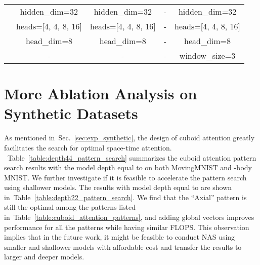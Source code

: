 \documentclass{article}
\newcommand{\tabref}[1]{Table~\ref{#1}}
\newcommand{\secref}[1]{Sec.~\ref{#1}}
\def\nbody{-body MNIST}
\begin{document}
\begin{table}[!tb]
\begin{center}
{\begin{tabular}{l|c|c|c|c}
   & hidden\_dim=32 & hidden\_dim=32    & -    & hidden\_dim=32 \\
   & heads=[4, 4, 8, 16] & heads=[4, 4, 8, 16] & - & heads=[4, 4, 8, 16] \\
   & head\_dim=8 & head\_dim=8 & - & head\_dim=8 \\
   & - & - & - & window\_size=3 \\
	\bottomrule[1.5pt]
	\end{tabular}
	}  \end{center}
\end{table}





\section{More Ablation Analysis on Synthetic Datasets}
As mentioned in~\secref{sec:exp_synthetic}, the design of cuboid attention greatly facilitates the search for optimal space-time attention. 
~\tabref{table:depth44_pattern_search} summarizes the cuboid attention pattern search results with the model depth equal to  on both MovingMNIST and \nbody{}. 
We further investigate if it is feasible to accelerate the pattern search using shallower models. 
The results with model depth equal to  are shown in~\tabref{table:depth22_pattern_search}. 
We find that the ``Axial'' pattern is still the optimal among the patterns listed in~\tabref{table:cuboid_attention_patterns}, and adding global vectors improves performance for all the patterns while having similar FLOPS. 
This observation implies that in the future work, it might be feasible to conduct NAS using smaller and shallower models with affordable cost and transfer the results to larger and deeper models.
\end{document}
